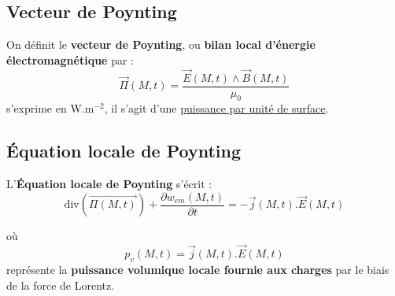 \subsection{Vecteur de Poynting} %
\label{sub:Vecteur de Poynting}

On définit le \textbf{vecteur de Poynting}, ou \textbf{bilan local d'énergie électromagnétique} par : 
\begin{equation}
  \overrightarrow{\Pi}(M,t) = \frac{\overrightarrow{E}(M,t)\wedge \overrightarrow{B}(M,t)}{\mu_0} 
\end{equation}
s'exprime en $\mathrm{W}. \mathrm{m} ^{-2}$, il s'agit d'une \underline{puissance par unité de surface}.

\subsection{Équation locale de Poynting} %
\label{sub:Équation locale de Poynting}

L'\textbf{Équation locale de Poynting} s'écrit : 
\begin{equation}
  \boxed{ \mathrm{div}( \overrightarrow{\Pi(M,t)}) + \frac{\partial  w _{em}(M,t)}{\partial t} = - \overrightarrow{j}(M,t) . \overrightarrow{E}(M,t)}
\label{eq:Poynting}
\end{equation}

où 
\begin{equation}
  p_v (M,t) = \overrightarrow{j}(M,t). \overrightarrow{E}(M,t)
\end{equation}
représente la \textbf{puissance volumique locale fournie aux charges} par le biais de la force de Lorentz.

